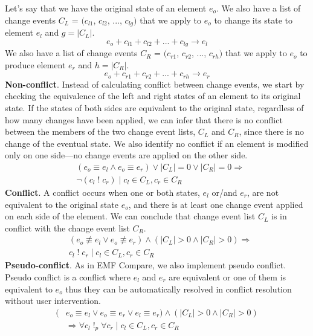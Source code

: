 Let’s say that we have the original state of an element $e_{o}$. We also have a list of change events $C_{L}$ = $(c_{l1}$, $c_{l2}$, ..., $c_{lg})$ that we apply to $e_{o}$ to change its state to element $e_{l}$ and $g = |C_{L}|$.
\begin{equation} \label{eq:ecbp_left}
e_{o} + c_{l1} + c_{l2} + ... + c_{lg} \rightarrow e_{l}
\end{equation}
We also have a list of change events $C_{R}$ = $(c_{r1}$, $c_{r2}$, ..., $c_{rh})$ that we apply to $e_{o}$ to produce element $e_{r}$ and $h = |C_{R}|$.
\begin{equation} \label{eq:ecbp_right}
e_{o} + c_{r1} + c_{r2} + ... + c_{rh} \rightarrow e_{r}
\end{equation}
\textbf{Non-conflict}. Instead of calculating conflict between change events, we start by checking the equivalence of the left and right states of an element to its original state. If the states of both sides are equivalent to the original state, regardless of how many changes have been applied, we can infer that there is no conflict between the members of the two change event lists, $C_{L}$ and $C_{R}$, since there is no change of the eventual state. We also identify no conflict if an element is modified only on one side—no change events are applied on the other side.
\begin{equation} \label{eq:ecbp_nonconflict}
\begin{split}
	& (e_{o} \equiv e_{l} \wedge e_{o} \equiv e_{r}) \vee |C_{L}| = 0 \vee |C_{R}| = 0 \Rightarrow\\
	& \neg(c_{l} \;!\; c_{r}) \;|\; c_{l} \in C_{L}, c_{r} \in C_{R}
\end{split}
\end{equation}
\textbf{Conflict}. A conflict occurs when one or both states, $e_{l}$ or/and $e_{r}$, are not equivalent to the original state $e_{o}$, and there is at least one change event applied on each side of the element. We can conclude that change event list $C_{L}$ is in conflict with the change event list $C_{R}$.
\begin{equation} \label{eq:ecbp_conflict}
\begin{split}
	& (e_{o} \not\equiv e_{l} \vee e_{o} \not\equiv e_{r}) \wedge (|C_{L}| > 0 \wedge |C_{R}| > 0) \Rightarrow\\
	& c_{l} \;!\; c_{r} \;|\; c_{l} \in C_{L}, c_{r} \in C_{R}
\end{split}
\end{equation}
\textbf{Pseudo-conflict}. As in EMF Compare, we also implement pseudo conflict. Pseudo conflict is a conflict where $e_{l}$ and $e_{r}$ are equivalent or one of them is equivalent to $e_{o}$ thus they can be automatically resolved in conflict resolution without user intervention.
\begin{equation} \label{eq:ecbp_pseudoconflict}
\begin{split}
	(& e_{o} \equiv e_{l} \vee e_{o} \equiv e_{r} \vee e_{l} \equiv e_{r}) \wedge (|C_{L}| > 0 \wedge |C_{R}| > 0)\\
	& \Rightarrow \forall c_{l} \;!_{p}\; \forall c_{r} \;|\; c_{l} \in C_{L}, c_{r} \in C_{R}
\end{split}
\end{equation} 

